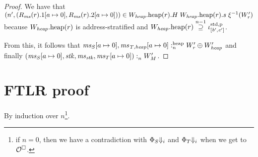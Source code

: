 \documentclass[a4paper]{article}
\begin{document}
\begin{proof}
  We have that $\npair[n']{(R_\ms(r).1\update{a}{0},R_\ms(r).2\update{a}{0})} \in \pwheap[W_\var{heap}](r).H \;
  \pwheap[W_\var{heap}](r).s \; \xi^{-1}(W_r')$ because $\pwheap[W_\var{heap}](r)$ is address-stratified and $\pwheap[W_\var{heap}](r) \nsupeq[n-1] \stdreg{[\baddr',\eaddr']}{\pur}$.

  From this, it follows that $\memSatHeap{\ms_S\update{a}{0},\ms_\var{T,heap}\update{a}{0}}{W_r' \oplus W_\var{heap}'}$ and finally $\memSat{(\ms_S\update{a}{0},\stk,\ms_\stk,\ms_T\update{a}{0})}{W_M'}$.
\end{proof}

\section{FTLR proof}
By induction over $n$\footnote{if $n=0$, then we have a contradiction with $\Phi_S\term[i]$ and $\Phi_T\term[i]$ when we get to $\lro$.}.
\end{document}
